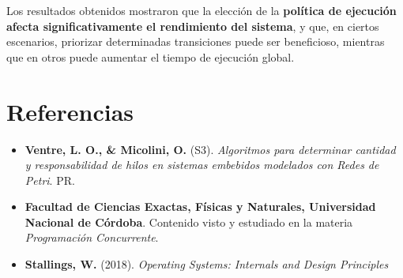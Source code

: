\documentclass[12pt]{article}
\begin{document}
Los resultados obtenidos mostraron que la elección de la \textbf{política de ejecución} \textbf{afecta significativamente el rendimiento del sistema}, y que, en ciertos escenarios, priorizar determinadas transiciones puede ser beneficioso, mientras que en otros puede aumentar el tiempo de ejecución global.
\newpage
\section{Referencias}

\begin{itemize}
    \item \textbf{Ventre, L. O., \& Micolini, O.} (S3). \textit{Algoritmos para determinar cantidad y responsabilidad de hilos en sistemas embebidos modelados con Redes de Petri}. PR.
    
    \item \textbf{Facultad de Ciencias Exactas, Físicas y Naturales, Universidad Nacional de Córdoba}. Contenido visto y estudiado en la materia \textit{Programación Concurrente}.
    
    \item \textbf{Stallings, W.} (2018). \textit{Operating Systems: Internals and Design Principles}
\end{itemize}
\end{document}
